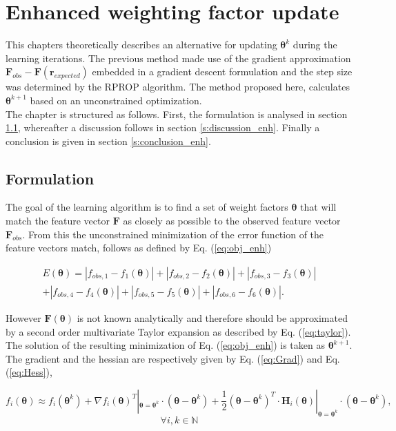 \chapter{Enhanced weighting factor update}
\label{cha:Enhancement}

This chapters theoretically describes an alternative for updating $\bm{\theta}^k$ during the learning iterations. The previous method made use of the gradient approximation $\bm{F}_{obs} - \bm{F}(\bm{r}_{expected})$ embedded in a gradient descent formulation and the step size was determined by the RPROP algorithm. The method proposed here, calculates $\bm{\theta}^{k+1}$ based on an unconstrained optimization.\\

The chapter is structured as follows. First, the formulation is analysed in section \ref{s:formulation_enh}, whereafter a discussion follows in section \ref{s:discussion_enh}. Finally a conclusion is given in section \ref{s:conclusion_enh}.

\section{Formulation}\label{s:formulation_enh}
The goal of the learning algorithm is to find a set of weight factors $\bm{\theta}$ that will match the feature vector $\bm{F}$ as closely as possible to the observed feature vector $\bm{F}_{obs}$. From this the unconstrained minimization of the error function of the feature vectors match, follows as defined by Eq. (\ref{eq:obj_enh})

\begin{multline}\label{eq:obj_enh}
E(\bm{\theta}) = |f_{obs,1} - f_1(\bm{\theta})|+|f_{obs,2} - f_2(\bm{\theta})|+|f_{obs,3} - f_3(\bm{\theta})|\\
+|f_{obs,4} - f_4(\bm{\theta})|+|f_{obs,5} - f_5(\bm{\theta})|+|f_{obs,6} - f_6(\bm{\theta})|.
\end{multline}

However $\bm{F}(\bm{\theta})$ is not known analytically and therefore should be approximated by a second order multivariate Taylor expansion as described by Eq. (\ref{eq:taylor}). The solution of the resulting minimization of Eq. (\ref{eq:obj_enh}) is taken as $\bm{\theta}^{k+1}$. The gradient and the hessian are respectively given by Eq. (\ref{eq:Grad}) and Eq. (\ref{eq:Hess}),

\begin{equation}\label{eq:taylor}
	f_i({\bm{\theta}}) \approx f_i(\bm{\theta}^k) + \nabla f_i(\bm{\theta})^T|_{\bm{\theta} = \bm{\theta}^k}\cdot (\bm{\theta} - \bm{\theta}^k) + \frac{1}{2}(\bm{\theta} - \bm{\theta}^k)^T\cdot \bm{H}_i(\bm{\theta})|_{\bm{\theta} = \bm{\theta}^k}\cdot(\bm{\theta} - \bm{\theta}^k),
\end{equation}
\[\forall i,k \in \mathbb{N}\]

